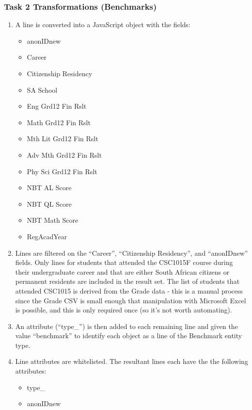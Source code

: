 \subsubsection{Task 2 Transformations (Benchmarks)}
\begin{enumerate}
    \item A line is converted into a JavaScript object with the fields:
          \begin{itemize}
              \item anonIDnew
              \item Career
              \item Citizenship Residency
              \item SA School
              \item Eng Grd12 Fin Rslt
              \item Math Grd12 Fin Rslt
              \item Mth Lit Grd12 Fin Rslt
              \item Adv Mth Grd12 Fin Rslt
              \item Phy Sci Grd12 Fin Rslt
              \item NBT AL Score
              \item NBT QL Score
              \item NBT Math Score
              \item RegAcadYear
          \end{itemize}
    \item Lines are filtered on the ``Career'', ``Citizenship Residency'', and ``anonIDnew'' fields. Only lines for students that attended the CSC1015F course during their undergraduate career and that are either South African citizens or permanent residents are included in the result set. The list of students that attended CSC1015 is derived from the Grade data - this is a manual process since the Grade CSV is small enough that manipulation with Microsoft Excel is possible, and this is only required once (so it's not worth automating).
    \item An attribute (``type\_'') is then added to each remaining line and given the value ``benchmark'' to identify each object as a line of the Benchmark entity type.
    \item Line attributes are whitelisted. The resultant lines each have the the following attributes:
          \begin{itemize}
              \item type\_
              \item anonIDnew

\end{itemize}
\end{enumerate}
